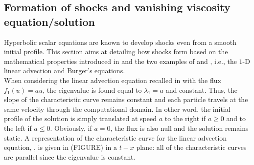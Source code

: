 \subsection{Formation of shocks and vanishing viscosity equation/solution}\label{sec:shock_form}
Hyperbolic scalar equations are known to develop shocks even from a smooth initial profile. This section aims at detailing how shocks form based on the mathematical properties introduced in  and the two examples of  and , i.e., the $1$-D linear advection and Burger's equations.\\

When considering the linear advection equation recalled in  with the flux $f_1(u) = au$, the eigenvalue is found equal to $\lambda_1=a$ and constant. Thus, the slope of the characteristic curve remains constant and each particle travels at the same velocity through the computational domain. In other word, the initial profile of the solution is simply translated at speed $a$ to the right if $a \geq 0$ and to the left if $a \leq 0$. Obviously, if $a=0$, the flux is also null and the solution remains static. A representation of the characteristic curve for the linear advection equation, , is given in (FIGURE) in a $t-x$ plane: all of the characteristic curves are parallel since the eigenvalue is constant.

